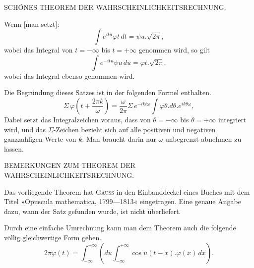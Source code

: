 \clearpage
{}%

\begin{center}
\large SCH\"ONES THEOREM DER WAHRSCHEINLICHKEITSRECHNUNG.
\end{center}

\noindent\hspace*{\parindent}Wenn [man setzt]:
\[
\int e^{itu}\varphi t\,dt = \psi u \mathord{.} \sqrt{2\pi},
\]
\noindent wobei das Integral von $t=-\infty$ bis $t=+\infty$ genommen wird, so gilt
\[
\int e^{-itu}\psi u\,du = \varphi t \mathord{.} \sqrt{2\pi},
\]
\noindent wobei das Integral ebenso genommen wird.

Die Begründung dieses Satzes ist in der folgenden Formel enthalten.
\[
\Sigma\,\varphi\!\left(t+\frac{2\pi k}{\omega}\right) = \frac{\omega}{2\pi}\Sigma\, e^{-ikt\omega}\int \varphi\theta\mathord{.} d\theta\mathord{.} e^{ik\theta\omega},
\]
\noindent Dabei setzt das Integralzeichen voraus, dass von $\theta=-\infty$ bis $\theta=+\infty$ integriert wird, und das $\Sigma$-Zeichen bezieht sich auf alle positiven und negativen ganzzahligen Werte von $k$. Man braucht darin nur $\omega$ unbegrenzt abnehmen zu lassen.

\begin{center}
BEMERKUNGEN ZUM THEOREM DER WAHRSCHEINLICHKEITSRECHNUNG.
\end{center}

\noindent\hspace*{\parindent}Das vorliegende Theorem hat \textsc{Gauss} in den Einbanddeckel eines Buches mit dem Titel »Opuscula mathematica, 1799---1813« eingetragen. Eine genaue Angabe dazu, wann der Satz gefunden wurde, ist nicht überliefert.

Durch eine einfache Umrechnung kann man dem Theorem auch die folgende völlig gleichwertige Form geben.
\[
2\pi\varphi(t) = \int^{+\infty}_{-\infty}\!\left(du\int^{+\infty}_{-\infty}\!\cos u(t-x)\mathord{.}\varphi(x)\,dx\right).
\]
